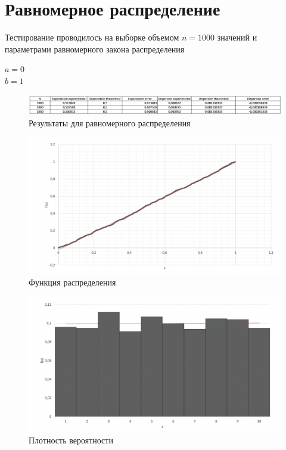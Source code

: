 \documentclass{article}
\begin{document}
	\section{Равномерное распределение}
		Тестирование проводилось на выборке объемом $n = 1000$ значений и параметрами равномерного закона распределения
		\begin{center}
			$a = 0$\\ 
			$b = 1$\\
		\end{center}
		\begin{center}
			\begin{figure}[!htb]
				\includegraphics[scale = 0.43]{uniform/3.png}
				\caption{Результаты для равномерного распределения}
			\end{figure}
		\end{center}
		
		\begin{figure}[!htb]
		    \includegraphics[scale = 0.3]{uniform/1.png}
    		\caption{Функция распределения}
		\end{figure}
		 	 	
		\begin{figure}[!htb]
			\includegraphics[scale = 0.3]{uniform/2.png}
			\caption{Плотность вероятности}
   		\end{figure}
   	\newpage
										
\end{document}
